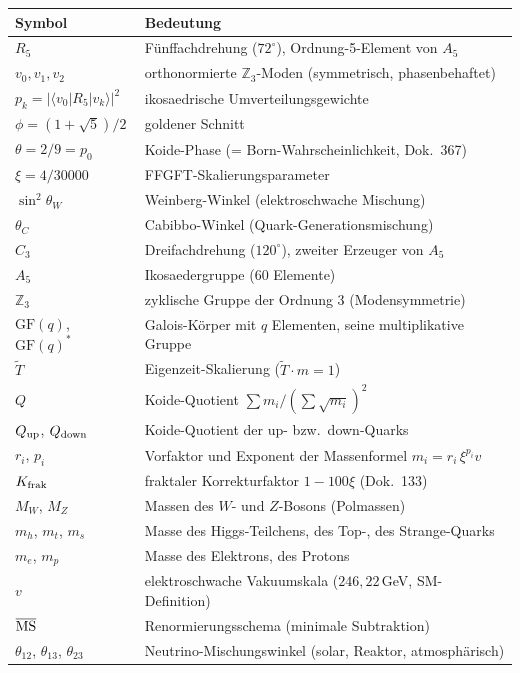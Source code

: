 \medskip
\begin{tabular}{@{}lp{9cm}@{}}
\toprule
\textbf{Symbol} & \textbf{Bedeutung} \\
\midrule
$R_5$ & Fünffachdrehung ($72^\circ$), Ordnung-5-Element von $A_5$ \\
$v_0,v_1,v_2$ & orthonormierte $\mathbb Z_3$-Moden (symmetrisch, phasenbehaftet) \\
$p_k = |\langle v_0|R_5|v_k\rangle|^2$ & ikosaedrische Umverteilungsgewichte \\
$\phi = (1+\sqrt5)/2$ & goldener Schnitt \\
$\theta = 2/9 = p_0$ & Koide-Phase (= Born-Wahrscheinlichkeit, Dok.~367) \\
$\xi = 4/30000$ & FFGFT-Skalierungsparameter \\
$\sin^2\theta_W$ & Weinberg-Winkel (elektroschwache Mischung) \\
$\theta_C$ & Cabibbo-Winkel (Quark-Generations\-mischung) \\
\midrule
$C_3$ & Dreifachdrehung ($120^\circ$), zweiter Erzeuger von $A_5$ \\
$A_5$ & Ikosaedergruppe (60 Elemente) \\
$\mathbb Z_3$ & zyklische Gruppe der Ordnung 3 (Modensymmetrie) \\
$\mathrm{GF}(q)$, $\mathrm{GF}(q)^*$ & Galois-Körper mit $q$ Elementen, seine multiplikative Gruppe \\
$\tilde T$ & Eigenzeit-Skalierung ($\tilde T\cdot m = 1$) \\
$Q$ & Koide-Quotient $\sum m_i/(\sum\sqrt{m_i})^2$ \\
$Q_{\rm up}$, $Q_{\rm down}$ & Koide-Quotient der up- bzw.\ down-Quarks \\
$r_i$, $p_i$ & Vorfaktor und Exponent der Massenformel $m_i = r_i\,\xi^{p_i}v$ \\
$K_{\rm frak}$ & fraktaler Korrekturfaktor $1-100\xi$ (Dok.~133) \\
\midrule
$M_W$, $M_Z$ & Massen des $W$- und $Z$-Bosons (Polmassen) \\
$m_h$, $m_t$, $m_s$ & Masse des Higgs-Teilchens, des Top-, des Strange-Quarks \\
$m_e$, $m_p$ & Masse des Elektrons, des Protons \\
$v$ & elektroschwache Vakuumskala ($246{,}22$\,GeV, SM-Definition) \\
$\overline{\rm MS}$ & Renormierungsschema (minimale Subtraktion) \\
$\theta_{12}$, $\theta_{13}$, $\theta_{23}$ & Neutrino-Mischungswinkel (solar, Reaktor, atmosphärisch) \\

\end{tabular}

